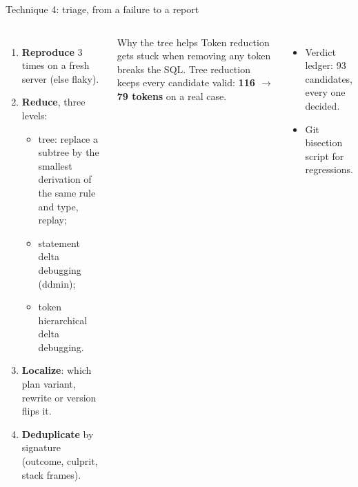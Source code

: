 \documentclass[aspectratio=169,10pt]{beamer}
\begin{document}
\begin{frame}{Technique 4: triage, from a failure to a report}
\small
\begin{columns}[T]
\begin{enumerate}
  \item \textbf{Reproduce} 3 times on a fresh server (else flaky).
  \item \textbf{Reduce}, three levels:
    \begin{itemize}
      \item tree: replace a subtree by the \alert{smallest derivation of the same rule and type}, replay;
      \item statement delta debugging (ddmin);
      \item token hierarchical delta debugging.
    \end{itemize}
  \item \textbf{Localize}: which plan variant, rewrite or version flips it.
  \item \textbf{Deduplicate} by signature (outcome, culprit, stack frames).
\end{enumerate}
\begin{block}{Why the tree helps}
Token reduction gets stuck when removing any token breaks the SQL. Tree reduction keeps every candidate valid: \textbf{116 $\rightarrow$ 79 tokens} on a real case.
\end{block}
\begin{itemize}
  \item Verdict ledger: 93 candidates, every one decided.
  \item Git bisection script for regressions.
\end{itemize}
\end{columns}
\end{frame}
\end{document}

